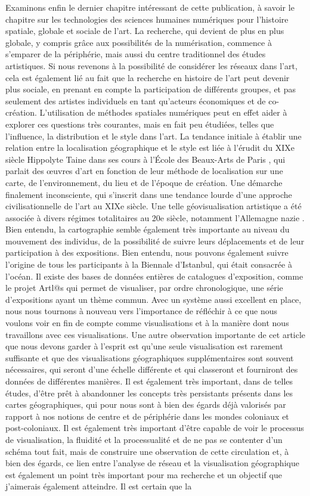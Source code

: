 \documentclass[a4paper, twoside, 12pt]{book}
\begin{document}
Examinons enfin le dernier chapitre intéressant de cette publication, à savoir le chapitre sur les technologies des sciences humaines numériques pour l'histoire spatiale, globale et sociale de l'art. La recherche, qui devient de plus en plus globale, y compris grâce aux possibilités de la numérisation, commence à s'emparer de la périphérie, mais aussi du centre traditionnel des études artistiques. Si nous revenons à la possibilité de considérer les réseaux dans l'art, cela est également lié au fait que la recherche en histoire de l'art peut devenir plus sociale, en prenant en compte la participation de différents groupes, et pas seulement des artistes individuels en tant qu'acteurs économiques et de co-création. L'utilisation de méthodes spatiales numériques peut en effet aider à explorer ces questions très courantes, mais en fait peu étudiées, telles que l'influence, la distribution et le style dans l'art. La tendance initiale à établir une relation entre la localisation géographique et le style est liée à l'érudit du XIXe siècle Hippolyte Taine dans ses cours à l'École des Beaux-Arts de Paris , qui parlait des œuvres d'art en fonction de leur méthode de localisation sur une carte, de l'environnement, du lieu et de l'époque de création. Une démarche finalement inconsciente, qui s'inscrit dans une tendance lourde d'une approche civilisationnelle de l'art au XIXe siècle. Une telle géovisualisation artistique a été associée à divers régimes totalitaires au 20e siècle, notamment l'Allemagne nazie . Bien entendu, la cartographie semble également très importante au niveau du mouvement des individus, de la possibilité de suivre leurs déplacements et de leur participation à des expositions. Bien entendu, nous pouvons également suivre l'origine de tous les participants à la Biennale d'Istanbul, qui était consacrée à l'océan. Il existe des bases de données entières de catalogues d'exposition, comme le projet Artl@s qui permet de visualiser, par ordre chronologique, une série d'expositions ayant un thème commun. Avec un système aussi excellent en place, nous nous tournons à nouveau vers l'importance de réfléchir à ce que nous voulons voir en fin de compte comme visualisations et à la manière dont nous travaillons avec ces visualisations. Une autre observation importante de cet article que nous devons garder à l'esprit est qu'une seule visualisation est rarement suffisante et que des visualisations géographiques supplémentaires sont souvent nécessaires, qui seront d'une échelle différente et qui classeront et fourniront des données de différentes manières. Il est également très important, dans de telles études, d'être prêt à abandonner les concepts très persistants présents dans les cartes géographiques, qui pour nous sont à bien des égards déjà valorisés par rapport à nos notions de centre et de périphérie dans les mondes coloniaux et post-coloniaux. Il est également très important d'être capable de voir le processus de visualisation, la fluidité et la processualité et de ne pas se contenter d'un schéma tout fait, mais de construire une observation de cette circulation et, à bien des égards, ce lien entre l'analyse de réseau et la visualisation géographique est également un point très important pour ma recherche et un objectif que j'aimerais également atteindre. Il est certain que la 
\end{document}
